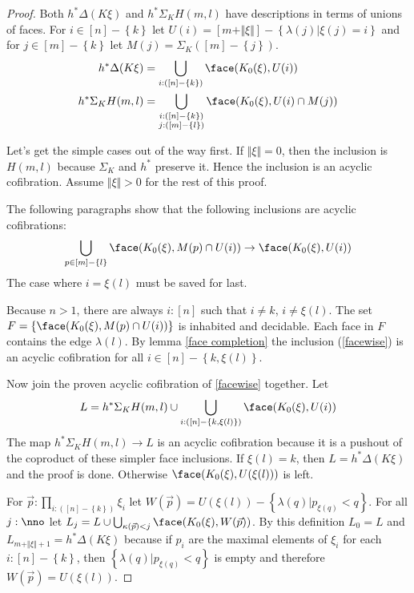 \documentclass{tac}
\newcommand\set[1]{\left\{#1\right\}}
\newcommand\ri{^*}
\newcommand\of{:}
\newcommand\simplex\Delta
\newcommand\norm[1]{\Vert #1 \Vert}
\newcommand\ka\kappa
\newcommand\la\lambda
\newcommand\depsum{\Sigma_}
\newcommand\U{U}
\newcommand\A{M}
\newcommand\W{W}
\begin{document}
\begin{proof} 
Both $h\ri\simplex(K\xi)$ and $h\ri \depsum K H(m,l)$ have descriptions in terms of unions of faces. For $i\in [n]-\set k$ let $\U(i) = [m+\norm\xi]-\set{\la(j)|\xi(j)=i}$ and for $j\in [m]-\set k$ let $\A(j) = \depsum K([m]-\set j)$.
\begin{align*}
h\ri\simplex(K\xi) &= \bigcup_{i\of([n]-\set{k})} \face(K_0(\xi),\U(i))\\
h\ri \depsum K H(m,l)&= \bigcup_{\substack{i\of([n]-\set{k})\\j\of([m]-\set l)}} \face(K_0(\xi),\U(i)\cap \A(j))
\end{align*}

Let's get the simple cases out of the way first. If $\norm\xi = 0$, then the inclusion is $H(m,l)$ because $\depsum K$ and $h\ri$ preserve it. Hence the inclusion is an acyclic cofibration. Assume $\norm\xi>0$ for the rest of this proof.

The following paragraphs show that the following inclusions are acyclic cofibrations:
\begin{equation} \bigcup_{p\in[m]-\set l} \face(K_0(\xi),\A(p)\cap\U(i))\to \face(K_0(\xi),\U(i)) \label{facewise} \end{equation}
The case where $i=\xi(l)$ must be saved for last.

Because $n>1$, there are always $i\of[n]$ such that $i\neq k$, $i\neq \xi(l)$. The set $F = \set{\face(K_0(\xi),\A(p)\cap\U(i))}$ is inhabited and decidable. Each face in $F$ contains the edge $\la(l)$. By lemma \ref{face completion} the inclusion (\ref{facewise}) is an acyclic cofibration for all $i\in [n]-\set{k,\xi(l)}$.

Now join the proven acyclic cofibration of \ref{facewise} together. Let
\[ L=h\ri \depsum K H(m,l)\cup\bigcup_{i\of([n]-\set{k,\xi(l)})}\face(K_0(\xi),\U(i)) \]
The map $h\ri \depsum K H(m,l)\to L$ is an acyclic cofibration because it is a pushout of the coproduct of these simpler face inclusions. If $\xi(l)=k$, then $L=h\ri \simplex(K\xi)$ and the proof is done. Otherwise $\face(K_0(\xi),\U(\xi(l)))$ is left.

For $\vec p \of\prod_{i\of([n]-\set k)}\xi_i$ let $\W(\vec p) = \U(\xi(l))-\set{ \la(q) | p_{\xi(q)} < q }$. For all $j\of\nno$ let $L_j = L\cup \bigcup_{ \ka(\vec p) < j } \face(K_0(\xi),\W(\vec p))$. By this definition $L_0=L$ and $L_{m+\norm\xi+1} = h\ri\simplex(K\xi)$ because if $p_i$ are the maximal elements of $\xi_i$ for each $i\of[n]-\set k$, then $\set{ \la(q) | p_{\xi(q)} < q }$ is empty and therefore $\W(\vec p) = \U(\xi(l))$.


\end{proof}
\end{document}
